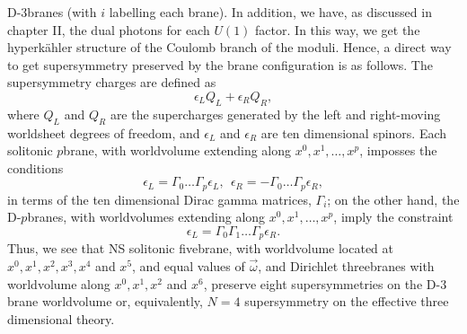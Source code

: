 D-$3$branes (with $i$ labelling each brane). In addition, we
have, as discussed in chapter II, the dual photons for each
$U(1)$ factor. In this way, we get the hyperk\"ahler structure of
the Coulomb branch of the moduli. Hence, a direct way to get
supersymmetry preserved by the brane configuration is as follows.
The supersymmetry charges are defined as 
\begin{equation}
\epsilon_L Q_L + \epsilon_R Q_R,
\label{eq:f3}
\end{equation}
where $Q_L$ and $Q_R$ are the supercharges generated by the left
and right-moving worldsheet degrees of freedom, and $\epsilon_L$
and $\epsilon_R$ are ten dimensional spinors. Each solitonic $p$brane, 
with worldvolume extending along
$x^0,x^1,\ldots,x^p$, imposses the conditions
\begin{equation}
\epsilon_L = \Gamma_0 \ldots \Gamma_p \epsilon_L, \: \:
\epsilon_R = - \Gamma_0 \ldots \Gamma_p \epsilon_R,
\label{eq:f4}
\end{equation}
in terms of the ten dimensional Dirac gamma matrices, $\Gamma_i$;
on the other hand, the D-$p$branes, with worldvolumes extending
along $x^0,x^1,\ldots,x^p$, imply the constraint
\begin{equation}
\epsilon_L = \Gamma_0 \Gamma_1 \ldots \Gamma_p \epsilon_R.
\label{eq:f5}
\end{equation}
Thus, we see that NS solitonic fivebrane, with worldvolume
located at $x^0,x^1,x^2,x^3,x^4$ and $x^5$, and equal values of
$\vec{\omega}$, and Dirichlet threebranes with worldvolume along
$x^0,x^1,x^2$ and $x^6$, preserve eight supersymmetries on the
D-$3$brane worldvolume or, equivalently, $N=4$ supersymmetry on the
effective three dimensional theory. 
  
